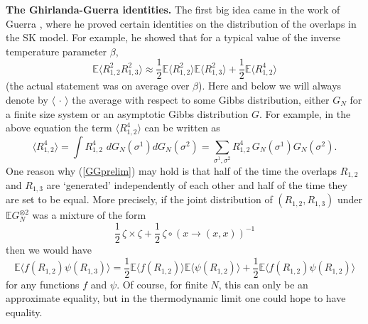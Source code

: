\documentclass[12pt]{article}
\newcommand{\e}{\mathbb{E}}
\newcommand{\la}{\langle}
\newcommand{\ra}{\rangle}
\theoremstyle{nonumberplain}
\begin{document}
\medskip
\noindent
\textbf{The Ghirlanda-Guerra identities.} The first big idea came in the work of Guerra \cite{GuerraGG}, where he proved certain identities on the distribution of the overlaps in the SK model. For example, he showed that for a typical value of the inverse temperature parameter $\beta$, 
\begin{equation}
\e \bigl\la R_{1,2}^2 R_{1,3}^2\bigr\ra \approx \frac{1}{2} \e \bigl\la R_{1,2}^2\bigr\ra  \e \bigl\la R_{1,3}^2\bigr\ra + \frac{1}{2} \e \bigl\la R_{1,2}^4\bigr\ra
\label{GGprelim}
\end{equation}
(the actual statement was on average over $\beta$). Here and below we will always denote by $\la\,\cdot\,\ra$ the average with respect to some Gibbs distribution, either $G_N$ for a finite size system or an asymptotic Gibbs distribution $G.$ For example, in the above equation the term $\la R_{1,2}^4\ra$ can be written as
$$
\bigl\la R_{1,2}^4\bigr\ra = \int \! R_{1,2}^4 \,\, dG_N(\sigma^1)dG_N(\sigma^2)
=  \sum_{\sigma^1,\sigma^2} R_{1,2}^4 \, G_N(\sigma^1)G_N(\sigma^2).
$$
One reason why (\ref{GGprelim}) may hold is that half of the time the overlaps $R_{1,2}$ and $R_{1,3}$ are `generated' independently of each other and half of the time they are set to be equal. More precisely, if the joint distribution of $(R_{1,2},R_{1,3})$  under $\e G_N^{\otimes 2}$ was a mixture of the form
$$
\frac{1}{2}\,\zeta \times \zeta + \frac{1}{2}\, \zeta\circ(x\to(x,x))^{-1}
$$
then we would have
$$
\e \bigl\la f(R_{1,2}) \psi(R_{1,3})\bigr\ra = \frac{1}{2} \e \bigl\la f(R_{1,2})\bigr\ra  \e \bigl\la \psi(R_{1,2})\bigr\ra + \frac{1}{2} \e \bigl\la f(R_{1,2})\psi(R_{1,2})\bigr\ra
$$
for any functions $f$ and $\psi.$ Of course, for finite $N$, this can only be an approximate equality, but in the thermodynamic limit one could hope to have equality. 
\end{document}
